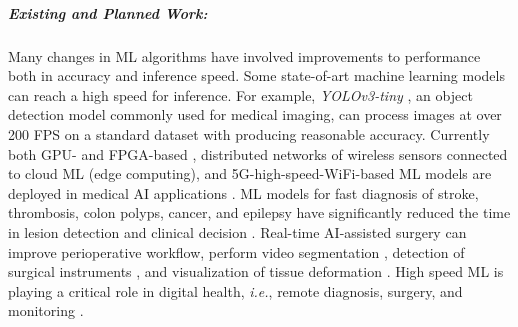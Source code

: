 \subparagraph*{Existing and Planned Work:} Many changes in ML algorithms have involved improvements to performance both in accuracy and inference speed. Some state-of-art machine learning models can reach a high speed for inference. For example, \textit{YOLOv3-tiny} \cite{Adarsh2020-hq}, an object detection model commonly used for medical imaging, can process images at over 200 FPS on a standard dataset with producing reasonable accuracy. Currently both GPU- and FPGA-based \cite{Satpathy2020-gs,Chang2020-ob,Zhang2020-bb}, distributed networks of wireless sensors connected to cloud ML (edge computing), and 5G-high-speed-WiFi-based ML models are deployed in medical AI applications \cite{Chen2018-qx,Zhang2020-ze,Morocho-Cayamcela2019-gt}. ML models for fast diagnosis of stroke, thrombosis, colon polyps, cancer, and epilepsy have significantly reduced the time in lesion detection and clinical decision \cite{Lee2020-oj,Nafee2020-yy,Nogueira-Rodriguez2020-zd,Bagheri2019-ee,Horie2019-hz}. Real-time AI-assisted surgery can improve perioperative workflow, perform video segmentation \cite{Volkov2017-oy}, detection of surgical instruments \cite{Choi2017-iv}, and visualization of tissue deformation \cite{Tonutti2017-vv}. High speed ML is playing a critical role in digital health, \textit{i.e.}, remote diagnosis, surgery, and monitoring \cite{Zhang2020-ze}.

